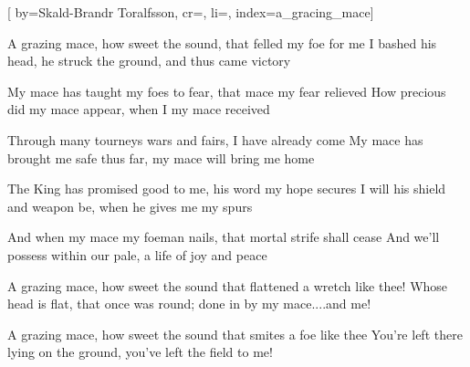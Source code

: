
[%
    by={Skald-Brandr Toralfsson},
    cr={},
    li={},
    index={a_gracing_mace}]


    \label{a_gracing_mace}

    \beginverse\memorize[verse]
        A grazing mace, how sweet the sound, that felled my foe for me
        I bashed his head, he struck the ground, and thus came victory
    \endverse

    \beginverse\memorize[verse]
        My mace has taught my foes to fear, that mace my fear relieved
        How precious did my mace appear, when I my mace received
    \endverse

    \beginverse\memorize[verse]
        Through many tourneys wars and fairs, I have already come
        My mace has brought me safe thus far, my mace will bring me home
    \endverse

    \beginverse\memorize[verse]
        The King has promised good to me, his word my hope secures
        I will his shield and weapon be, when he gives me my spurs
    \endverse

    \beginverse\memorize[verse]
        And when my mace my foeman nails, that mortal strife shall cease
        And we'll possess within our pale, a life of joy and peace
    \endverse

    \beginverse\memorize[verse]
        A grazing mace, how sweet the sound that flattened a wretch like thee!
        Whose head is flat, that once was round; done in by my mace....and me!
    \endverse

    \beginverse\memorize[verse]
        A grazing mace, how sweet the sound that smites a foe like thee
        You're left there lying on the ground, you've left the field to me!
    \endverse
\endsong
